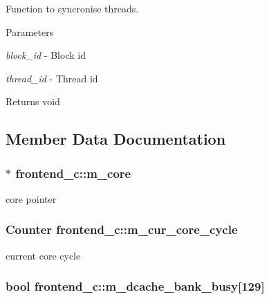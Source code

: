 Function to syncronise threads. 


\begin{DoxyParams}{Parameters}
\item[{\em block\_\-id}]-\/ Block id \item[{\em thread\_\-id}]-\/ Thread id \end{DoxyParams}
\begin{DoxyReturn}{Returns}
void 
\end{DoxyReturn}


\subsection{Member Data Documentation}
\hypertarget{classfrontend__c_a2e21eea52a0c6ee3c2e66daecd31b151}{
\subsubsection[{m\_\-core}]{$\ast$ {\bf frontend\_\-c::m\_\-core}}}
\label{classfrontend__c_a2e21eea52a0c6ee3c2e66daecd31b151}
core pointer \hypertarget{classfrontend__c_a64ef7913b57269b050b4ac4854c11317}{
\subsubsection[{m\_\-cur\_\-core\_\-cycle}]{\setlength{\rightskip}{0pt plus 5cm}Counter {\bf frontend\_\-c::m\_\-cur\_\-core\_\-cycle}}}
\label{classfrontend__c_a64ef7913b57269b050b4ac4854c11317}
current core cycle \hypertarget{classfrontend__c_a122be13c09b552fb5fd8fdfda289c9f2}{
\subsubsection[{m\_\-dcache\_\-bank\_\-busy}]{\setlength{\rightskip}{0pt plus 5cm}bool {\bf frontend\_\-c::m\_\-dcache\_\-bank\_\-busy}\mbox{[}129\mbox{]}}}
